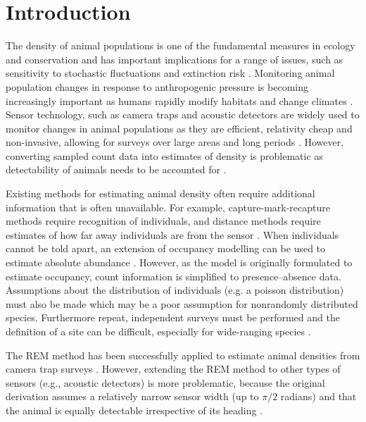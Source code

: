 \section{Introduction}


The density of animal populations is one of the fundamental measures in ecology and conservation and has important implications for a range of issues, such as sensitivity to stochastic fluctuations \cite{wright1983stochastic} and extinction risk \cite{purvis2000predicting}.
Monitoring animal population changes in response to anthropogenic pressure is becoming increasingly important as humans rapidly modify habitats and change climates \cite{everatt2014trophic}.
Sensor technology, such as camera traps \cite{karanth1995estimating, rowcliffe2008surveys} and acoustic detectors \cite{acevedo2006using, walters2012continental} are widely used to monitor changes in animal populations as they are efficient, relativity cheap and non-invasive, allowing for surveys over large areas and long periods \cite{rowcliffe2008surveys, kessel2014review, walters2013challenges}.
However, converting sampled count data into estimates of density is problematic as detectability of animals needs to be accounted for \cite{anderson2001need}.

Existing methods for estimating animal density often require additional information that is often unavailable.
For example, capture-mark-recapture methods \cite{karanth1995estimating, borchers2014continuous} require recognition of individuals, and distance methods \cite{harris2013applying} require estimates of how far away individuals are from the sensor \cite{barlow2005estimates, marques2011estimating}.
When individuals cannot be told apart, an extension of occupancy modelling can be used to estimate absolute abundance \cite{royle2003estimating}.
However, as the model is originally formulated to estimate occupancy,  count information is simplified to presence--absence data.
Assumptions about the distribution of individuals (e.g.
a poisson distribution) must also be made \cite{royle2003estimating} which may be a poor assumption for nonrandomly distributed species.
Furthermore repeat, independent surveys must be performed and the definition of a site can be difficult, especially for wide-ranging species \cite{mackenzie2005designing}.

The REM method has been successfully applied to estimate animal densities from camera trap surveys \cite{zero2013monitoring}.
However, extending the REM method to other types of sensors (e.g., acoustic detectors) is more problematic, because the original derivation assumes a relatively narrow sensor width (up to $\pi/2$ radians) and that the animal is equally detectable irrespective of its heading \cite{rowcliffe2008estimating}. 

